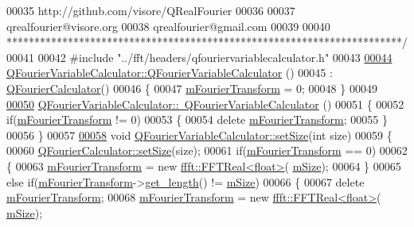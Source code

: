 \begin{DoxyCode}
00035 \textcolor{comment}{http://github.com/visore/QRealFourier}
00036 \textcolor{comment}{}
00037 \textcolor{comment}{qrealfourier@visore.org}
00038 \textcolor{comment}{qrealfourier@gmail.com}
00039 \textcolor{comment}{}
00040 \textcolor{comment}{***********************************************************************/}
00041 
00042 \textcolor{preprocessor}{#include "../fft/headers/qfouriervariablecalculator.h"}
00043 
\hypertarget{a00123_source_l00044}{}\hyperlink{a00055_a620f0850958df6f82854e0df6d2c5a0d}{00044} \hyperlink{a00055_a620f0850958df6f82854e0df6d2c5a0d}{QFourierVariableCalculator::QFourierVariableCalculator}
      ()
00045     : \hyperlink{a00052}{QFourierCalculator}()
00046 \{
00047     \hyperlink{a00055_a87b5b3f4f70fd4b6221541066e662fbe}{mFourierTransform} = 0;
00048 \}
00049 
\hypertarget{a00123_source_l00050}{}\hyperlink{a00055_ac98b83f9b6e72ac43a374a9f239d9de3}{00050} \hyperlink{a00055_ac98b83f9b6e72ac43a374a9f239d9de3}{QFourierVariableCalculator::~QFourierVariableCalculator}
      ()
00051 \{
00052     \textcolor{keywordflow}{if}(\hyperlink{a00055_a87b5b3f4f70fd4b6221541066e662fbe}{mFourierTransform} != 0)
00053     \{
00054         \textcolor{keyword}{delete} \hyperlink{a00055_a87b5b3f4f70fd4b6221541066e662fbe}{mFourierTransform};
00055     \}
00056 \}
00057 
\hypertarget{a00123_source_l00058}{}\hyperlink{a00055_a6de06a9ed2105755db1f92ec9c571b96}{00058} \textcolor{keywordtype}{void} \hyperlink{a00055_a6de06a9ed2105755db1f92ec9c571b96}{QFourierVariableCalculator::setSize}(\textcolor{keywordtype}{int} size)
00059 \{
00060     \hyperlink{a00052_a8eef0ee0494f04e73191890de476795a}{QFourierCalculator::setSize}(size);
00061     \textcolor{keywordflow}{if}(\hyperlink{a00055_a87b5b3f4f70fd4b6221541066e662fbe}{mFourierTransform} == 0)
00062     \{
00063         \hyperlink{a00055_a87b5b3f4f70fd4b6221541066e662fbe}{mFourierTransform} = \textcolor{keyword}{new} \hyperlink{a00010}{ffft::FFTReal<float>}(
      \hyperlink{a00052_adbddf53a590be6186e623d9fc89f0e80}{mSize});
00064     \}
00065     \textcolor{keywordflow}{else} \textcolor{keywordflow}{if}(\hyperlink{a00055_a87b5b3f4f70fd4b6221541066e662fbe}{mFourierTransform}->\hyperlink{a00010_abdd5b144ba5737c7ad27095d1658c29e}{get\_length}() != \hyperlink{a00052_adbddf53a590be6186e623d9fc89f0e80}{mSize})
00066     \{
00067         \textcolor{keyword}{delete} \hyperlink{a00055_a87b5b3f4f70fd4b6221541066e662fbe}{mFourierTransform};
00068         \hyperlink{a00055_a87b5b3f4f70fd4b6221541066e662fbe}{mFourierTransform} = \textcolor{keyword}{new} \hyperlink{a00010}{ffft::FFTReal<float>}(
      \hyperlink{a00052_adbddf53a590be6186e623d9fc89f0e80}{mSize});

\end{DoxyCode}
